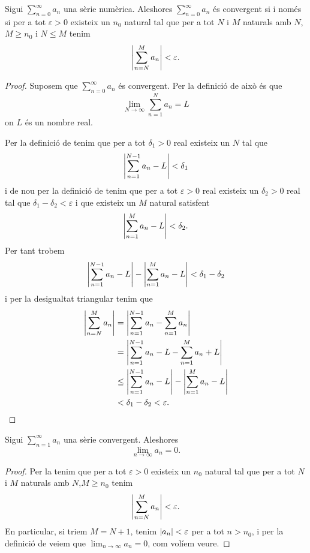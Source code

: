 \documentclass[../../Main.tex]{subfiles}
\begin{document}
	\begin{theorem}
		\label{thm:Condició de Cauchy per sèries numèriques}
		Sigui \(\sum_{n=0}^{\infty}a_{n}\) una sèrie numèrica. Aleshores \(\sum_{n=0}^{\infty}a_{n}\) és convergent si i només si per a tot \(\varepsilon>0\) existeix un \(n_{0}\) natural tal que per a tot \(N\) i \(M\) naturals amb \(N\),\(M\geq n_{0}\) i \(N\leq M\) tenim
		\[\abs{\sum_{n=N}^{M}a_{n}}<\varepsilon.\]
		\begin{proof}
			Suposem que \(\sum_{n=0}^{\infty}a_{n}\) és convergent. Per la definició de  això és que
			\[\lim_{N\to\infty}\sum_{n=1}^{N}{a_{n}}=L\]
			on \(L\) és un nombre real.
			
			Per la definició de  tenim que per a tot \(\delta_{1}>0\) real existeix un \(N\) tal que
			\[\abs{\sum_{n=1}^{N-1}{a_{n}}-L}<\delta_{1}\]
			i de nou per la definició de  tenim que per a tot \(\varepsilon>0\) real existeix un \(\delta_{2}>0\) real tal que \(\delta_{1}-\delta_{2}<\varepsilon\) i que existeix un \(M\) natural satisfent
			\[\abs{\sum_{n=1}^{M}a_{n}-L}<\delta_{2}.\]
			Per tant trobem
			\[\abs{\sum_{n=1}^{N-1}a_{n}-L}-\abs{\sum_{n=1}^{M}a_{n}-L}<\delta_{1}-\delta_{2}\]
			i per la desigualtat triangular %
			tenim que
			\begin{align*}
				\abs{\sum_{n=N}^{M}a_{n}}&=\abs{\sum_{n=1}^{N-1}a_{n}-\sum_{n=1}^{M}a_{n}}\\
				&=\abs{\sum_{n=1}^{N-1}a_{n}-L-\sum_{n=1}^{M}a_{n}+L}\\
				&\leq\abs{\sum_{n=1}^{N-1}a_{n}-L}-\abs{\sum_{n=1}^{M}a_{n}-L}\\
				&<\delta_{1}-\delta_{2}<\varepsilon.\qedhere
			\end{align*}
		\end{proof}
	\end{theorem}
	\begin{corollary}
		\label{cor:condició de Cauchy}\label{cor:terme general tendeix a zero en una sèrie convergent}
		Sigui \(\sum_{n=1}^{\infty}a_{n}\) una sèrie convergent. Aleshores
		\[\lim_{n\to\infty}a_{n}=0.\]
		\begin{proof}
			Per la  tenim que per a tot \(\varepsilon>0\) existeix un \(n_{0}\) natural tal que per a tot \(N\) i \(M\) naturals amb \(N\),\(M\geq n_{0}\) tenim
			\[\abs{\sum_{n=N}^{M}a_{n}}<\varepsilon.\]
			En particular, si triem \(M=N+1\), tenim \(\abs{a_{n}}<\varepsilon\) per a tot \(n>n_{0}\), i per la definició de  veiem que \(\lim_{n\to\infty}a_{n}=0\), com volíem veure.
		\end{proof}
	\end{corollary}
\end{document}
